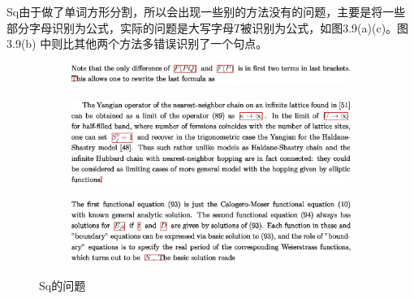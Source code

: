 Sq由于做了单词方形分割，所以会出现一些别的方法没有的问题，主要是将一些部分字母识别为公式，实际的问题是大写字母$T$被识别为公式，如图3.9(a)(c)。图3.9(b) 中则比其他两个方法多错误识别了一个句点。
\begin{figure}[hp]
    \centering

    \begin{subfigure}[b]{\linewidth}
    \centering
    \includegraphics[scale=0.3]{eps/sq1.eps}
    \caption{\label{fig:fig1}}
    \end{subfigure}

    \begin{subfigure}[b]{\linewidth}
    \centering
    \includegraphics[scale=0.3]{eps/sq2.eps}
    \caption{\label{fig:fig2}}
    \end{subfigure}

    \begin{subfigure}[b]{\linewidth}
    \centering
    \includegraphics[scale=0.3]{eps/sq3.eps}
    \caption{\label{fig:fig3}}
    \end{subfigure}

    
    \caption{Sq的问题}
    \label{fig:label}
\end{figure}